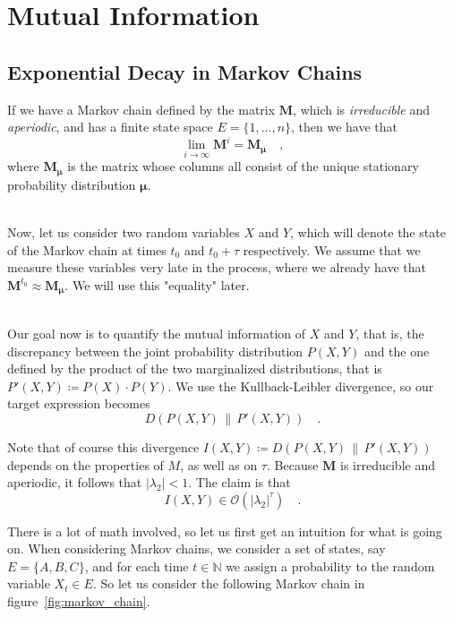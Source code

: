 \documentclass[../../main.tex]{subfiles}
\begin{document}
\section{Mutual Information}
\subsection{Exponential Decay in Markov Chains}
    \noindent
    If we have a Markov chain defined by the matrix $\boldsymbol{M}$, which is \emph{irreducible} and \emph{aperiodic}, and has a finite state space $E = \{1, \dots, n\}$, then we have that
    \[
        \lim_{i \to \infty} \boldsymbol{M}^i = \boldsymbol{M}_{\boldsymbol{\mu}} \quad ,
    \]
    where $\boldsymbol{M_\mu}$ is the matrix whose columns all consist of the unique stationary probability distribution $\boldsymbol{\mu}$.

    ~\\
    Now, let us consider two random variables $X$ and $Y$, which will denote the state of the Markov chain at times $t_0$ and $t_0 + \tau$ respectively. We assume that we measure these variables very late in the process, where we already have that $\boldsymbol{M}^{t_0} \approx \boldsymbol{M}_{\boldsymbol{\mu}}$. We will use this "equality" later.

    ~\\
    Our goal now is to quantify the mutual information of $X$ and $Y$, that is, the discrepancy between the joint probability distribution $P(X, Y)$ and the one defined by the product of the two marginalized distributions, that is $P'(X, Y) \coloneqq P(X) \cdot P(Y)$. We use the Kullback-Leibler divergence, so our target expression becomes
    \[
        D(P(X, Y) \,\|\, P'(X, Y)) \quad .
    \]

    \smallskip \noindent
    Note that of course this divergence $I(X, Y) \coloneqq D(P(X, Y) \,\|\, P'(X, Y))$ depends on the properties of $M$, as well as on $\tau$. Because $\boldsymbol{M}$ is irreducible and aperiodic, it follows that $|\lambda_2| < 1$. The claim is that
    \[
        I(X, Y) \in \mathcal{O}(|\lambda_2|^\tau) \quad .
    \]
    
    \bigskip \noindent
    There is a lot of math involved, so let us first get an intuition for what is going on. When considering Markov chains, we consider a set of states, say $E = \{A, B, C\}$, and for each time $t \in \mathbb{N}$ we assign a probability to the random variable $X_t \in E$. So let us consider the following Markov chain in figure~\ref{fig:markov_chain}.
\end{document}
